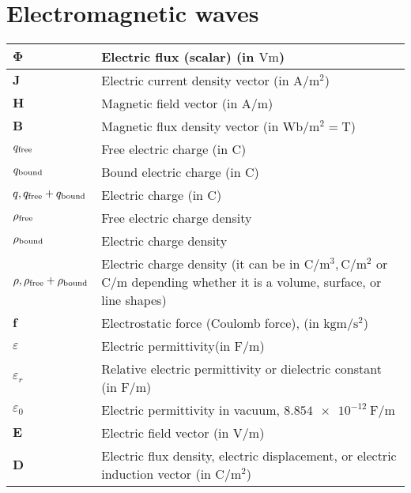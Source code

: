 \documentclass{article}
\begin{document}
\section{Electromagnetic waves}
\begin{xltabular}{\textwidth}{XX}
    \(\mathbf{\Phi}\) & Electric flux (scalar) (in \(\si{\volt\meter}\))\\ \hline
    \(\mathbf{J}\) & Electric current density vector (in \(\si{\ampere\per\square\meter}\))\\ \hline
    \(\mathbf{H}\) & Magnetic field vector (in \(\si{\ampere\per\meter}\))\\ \hline
    \(\mathbf{B}\) & Magnetic flux density vector (in \(\si{\weber\per\meter\squared} = \si{\tesla}\))\\ \hline
    \(q_{\textnormal{free}}\) & Free electric charge (in \(\si{\coulomb}\)) \\ \hline
    \(q_{\textnormal{bound}}\) & Bound electric charge (in \(\si{\coulomb}\)) \\ \hline
    \(q, q_{\textnormal{free}}+q_{\textnormal{bound}}\) & Electric charge (in \(\si{\coulomb}\)) \\ \hline
    \(\rho_{\textnormal{free}}\) & Free electric charge density\\ \hline
    \(\rho_{\textnormal{bound}}\) & Electric charge density\\ \hline
    \(\rho, \rho_{\textnormal{free}}+\rho_{\textnormal{bound}}\) & Electric charge density (it can be in \(\si{\coulomb\per\meter^3}, \si{\coulomb\per\meter^2}\) or \(\si{\coulomb\per\meter}\) depending whether it is a volume, surface, or line shapes) \\ \hline
    \(\mathbf{f}\) & Electrostatic force (Coulomb force), (in \(\si{\kilo\gram\meter\per\second\squared}\)) \\ \hline
    \(\varepsilon\) & Electric permittivity(in \(\si{\farad\per\meter}\)) \cite{ramoFieldsWavesCommunication1994} \\ \hline
    \(\varepsilon_r\) & Relative electric permittivity or dielectric constant (in \(\si{\farad\per\meter}\)) \cite{ramoFieldsWavesCommunication1994} \\ \hline
    \(\varepsilon_0\) & Electric permittivity in vacuum, \(\SI{8.854e-12}{\farad\per\meter}\) \cite{ramoFieldsWavesCommunication1994} \\ \hline
    \(\mathbf{E}\) & Electric field vector (in \(\si{\volt\per\meter}\))\\ \hline
    \(\mathbf{D}\) & Electric flux density, electric displacement, or electric induction vector (in \(\si{\coulomb\per\meter\squared}\))\\ \hline

\end{xltabular}
\end{document}
